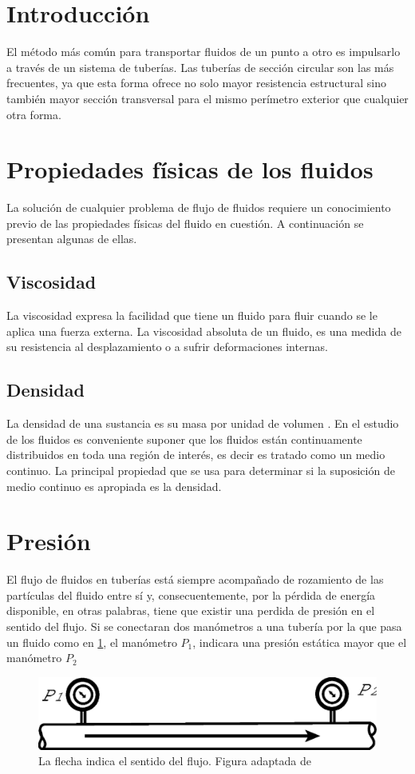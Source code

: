 \documentclass[11pt,letterpaper]{article}
\begin{document}
	\section{Introducción}
	
	El método más común para transportar fluidos de un punto a otro es impulsarlo a través de un sistema de tuberías. Las tuberías de sección circular son las más frecuentes, ya que esta forma ofrece no solo mayor resistencia estructural sino también mayor sección transversal para el mismo perímetro exterior que cualquier otra forma. \parencite[1.1]{crane}
	
	\section{Propiedades físicas de los fluidos}
	
	La solución de cualquier problema de flujo de fluidos requiere un conocimiento previo de las propiedades físicas del fluido en cuestión. A continuación se presentan algunas de ellas.
	
	\subsection{Viscosidad}
	
	La viscosidad expresa la facilidad que tiene un fluido para fluir cuando se le aplica una fuerza externa. La viscosidad absoluta de un fluido, es una medida de su resistencia al desplazamiento o  a sufrir deformaciones internas. \parencite[1.2]{crane}
	
	\subsection{Densidad}
	
	La densidad de una sustancia es su masa por unidad de volumen \parencite{crane}. En el estudio de los fluidos es conveniente suponer que los fluidos están continuamente distribuidos en toda una región de interés, es decir es tratado como un medio continuo. La principal propiedad que se usa para determinar si la suposición de medio continuo es apropiada es la densidad.\parencite[10]{merle}
	
	\section{Presión}
	
	El flujo de fluidos en tuberías está siempre acompañado de rozamiento de las partículas del fluido entre sí y, consecuentemente, por la pérdida de energía disponible, en otras palabras, tiene que existir una perdida de presión en el sentido del flujo. Si se conectaran dos manómetros a una tubería por la que pasa un fluido como en \ref{tuberia}, el manómetro $P_1$, indicara una presión estática mayor que el manómetro $P_2$ \parencite[1.7]{crane}
	
		\begin{figure}[H]
			\centering
			\includegraphics[width=0.6\linewidth]{Vectores/Tuberia_manometros}
			\caption{La flecha indica el sentido del flujo. Figura adaptada de \parencite[1.7]{crane}}
			\label{tuberia}
		\end{figure}
	
	\printbibliography[title={Referencias}]
	
\end{document}
